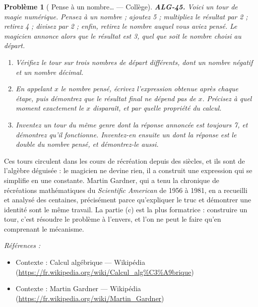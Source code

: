 \documentclass[11pt]{article}
\newtheorem{problem}{Problème}
\newenvironment{refs}{\par\small\noindent\emph{Références :}\begin{itemize}\setlength\itemsep{0pt}}{\end{itemize}\normalsize}
\begin{document}
\bigskip

\begin{problem}[{\og{} Pense à un nombre\dots{} \fg{} --- Collège}]
\textbf{ALG-45.} Voici un tour de magie numérique. Pensez à un nombre ; ajoutez 5 ; multipliez
le résultat par 2 ; retirez 4 ; divisez par 2 ; enfin, retirez le nombre auquel vous aviez pensé.
Le magicien annonce alors que le résultat est 3, quel que soit le nombre choisi au départ.
\begin{enumerate}
\item[(a)] Vérifiez le tour sur trois nombres de départ différents, dont un nombre négatif et un nombre
décimal.
\item[(b)] En appelant $ x $ le nombre pensé, écrivez l'expression obtenue après chaque étape, puis
démontrez que le résultat final ne dépend pas de $ x $. Précisez à quel moment exactement le
$ x $ disparaît, et par quelle propriété du calcul.
\item[(c)] Inventez un tour du même genre dont la réponse annoncée est toujours 7, et démontrez qu'il
fonctionne. Inventez-en ensuite un dont la réponse est le double du nombre pensé, et démontrez-le
aussi.
\end{enumerate}

\end{problem}

\noindent Ces tours circulent dans les cours de récréation depuis des siècles, et ils sont
de l'algèbre déguisée : le magicien ne devine rien, il a construit une expression qui se simplifie
en une constante. Martin Gardner, qui a tenu la chronique de récréations mathématiques du
\textit{Scientific American} de 1956 à 1981, en a recueilli et analysé des centaines, précisément
parce qu'expliquer le truc et démontrer une identité sont le même travail. La partie (c) est la
plus formatrice : construire un tour, c'est résoudre le problème à l'envers, et l'on ne peut le
faire qu'en comprenant le mécanisme.

\begin{refs}
\item Contexte : Calcul algébrique --- Wikipédia (\url{https://fr.wikipedia.org/wiki/Calcul_alg%C3%A9brique})
\item Contexte : Martin Gardner --- Wikipédia (\url{https://fr.wikipedia.org/wiki/Martin_Gardner})
\end{refs}

\bigskip
\end{document}
